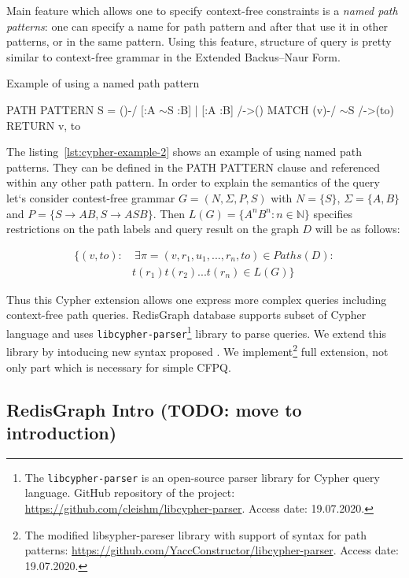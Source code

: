 Main feature which allows one to specify context-free constraints is a \textit{named path patterns}: one can specify a name for path pattern and after that use it in other patterns, or in the same pattern. Using this feature, structure of query is pretty similar to context-free grammar in the Extended Backus–Naur Form.

\begin{algorithm}
\begin{algorithmic}[1]
\caption{Example of using a named path pattern}
\label{lst:cypher-example-2}
\State PATH PATTERN S = ()-/ [:A $\sim$S :B] | [:A :B] /->()
\State MATCH (v)-/ $\sim$S /->(to)
\State RETURN v, to
\end{algorithmic}
\end{algorithm}

The listing~\ref{lst:cypher-example-2} shows an example of using named path patterns. They can be defined in the PATH PATTERN clause and referenced within any other path pattern. In order to explain the semantics of the query let`s consider contest-free grammar $G=(N, \Sigma, P, S)$ with $N=\{S\}$, $\Sigma=\{A,B\}$ and $P=\{S \xrightarrow{} A B, S \xrightarrow{} ASB \}$. Then $L(G)=\{A^nB^n: n \in \mathbb{N}\}$ specifies restrictions on the path labels and query result on the graph $D$ will be as follows:

\begin{align*}
\{ (v, to): &~\exists \pi=(v,r_1,u_1,...,r_n,to) \in Paths(D): \\
            &t(r_1)t(r_2)...t(r_n) \in L(G) \}
\end{align*}

Thus this Cypher extension allows one express more complex queries including context-free path queries.
RedisGraph database supports subset of Cypher language and uses \texttt{libcypher-parser}\footnote{The \texttt{libcypher-parser} is an open-source parser library for Cypher query language. GitHub repository of the project: \url{https://github.com/cleishm/libcypher-parser}. Access date: 19.07.2020.} library to parse queries.
We extend this library by intoducing new syntax proposed . We implement\footnote{The modified libsypher-pareser library with support of syntax for path patterns: \url{https://github.com/YaccConstructor/libcypher-parser}. Access date: 19.07.2020.} full extension, not only part which is necessary for simple CFPQ. 

\subsection{RedisGraph Intro (TODO: move to introduction)}

